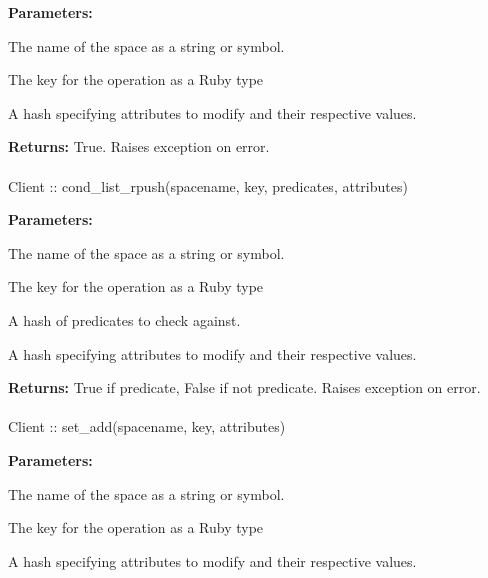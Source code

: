 \noindent\textbf{Parameters:}
\begin{description}[labelindent=\widthof{{\code{attributes}}},leftmargin=*,noitemsep,nolistsep,align=right]
\item[\code{spacename}] The name of the space as a string or symbol.
\item[\code{key}] The key for the operation as a Ruby type
\item[\code{attributes}] A hash specifying attributes to modify and their respective values.
\end{description}

\noindent\textbf{Returns:}
True.  Raises exception on error.

\paragraph{}
\begin{ccode}
Client :: cond_list_rpush(spacename, key, predicates, attributes)
\end{ccode}
\funcdesc 

\noindent\textbf{Parameters:}
\begin{description}[labelindent=\widthof{{\code{predicates}}},leftmargin=*,noitemsep,nolistsep,align=right]
\item[\code{spacename}] The name of the space as a string or symbol.
\item[\code{key}] The key for the operation as a Ruby type
\item[\code{predicates}] A hash of predicates to check against.
\item[\code{attributes}] A hash specifying attributes to modify and their respective values.
\end{description}

\noindent\textbf{Returns:}
True if predicate, False if not predicate.  Raises exception on error.

\paragraph{}
\begin{ccode}
Client :: set_add(spacename, key, attributes)
\end{ccode}
\funcdesc 

\noindent\textbf{Parameters:}
\begin{description}[labelindent=\widthof{{\code{attributes}}},leftmargin=*,noitemsep,nolistsep,align=right]
\item[\code{spacename}] The name of the space as a string or symbol.
\item[\code{key}] The key for the operation as a Ruby type
\item[\code{attributes}] A hash specifying attributes to modify and their respective values.
\end{description}

